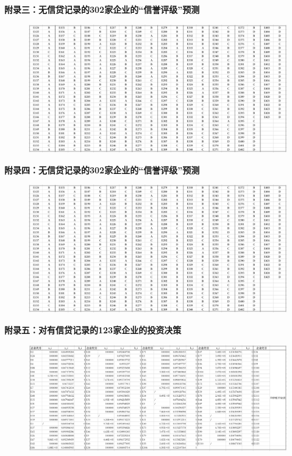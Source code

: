 \documentclass[bwprint]{cumcm}
\begin{document}
\begin{appendices}
\newpage
 \noindent \textbf{附录三：无信贷记录的302家企业的“信誉评级”预测}
 \begin{figure}[h]%
	\centering  %
	\includegraphics[width=1\linewidth]{figures/figure9.jpg}  %
	\label{fig:mcmthesis-logo}   %
\end{figure}

\newpage
 \noindent \textbf{附录四：无信贷记录的302家企业的“信誉评级”预测}
 \begin{figure}[h]%
	\centering  %
	\includegraphics[width=1\linewidth]{figures/figure9.jpg}  %
	\label{fig:mcmthesis-logo}   %
\end{figure}

\newpage
 \noindent \textbf{附录五：对有信贷记录的123家企业的投资决策}
 \begin{figure}[h]%
	\centering  %
	\includegraphics[width=1\linewidth]{figures/T1.jpg}  %
	\label{fig:mcmthesis-logo}   %
\end{figure}


\end{appendices}
\end{document}
